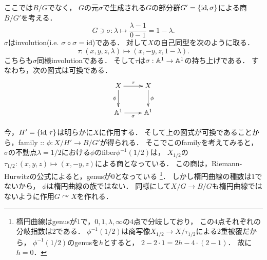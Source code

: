 \documentclass[a4paper]{jsarticle}
\newcommand{\acton}{\curvearrowright}
\begin{document}
\begin{Example}
        ここでは$B/G$でなく，
        $G$の元$\sigma$で生成される$G$の部分群$G'=\{\mathrm{id}_{\!}, \sigma\}$による商$B/G'$を考える．
        \[ G \ni \sigma: \lambda \mapsto \frac{\lambda-1}{0-1}=1-\lambda. \]
        $\sigma$はinvolution(i.e. $\sigma \circ \sigma=\mathrm{id}_{\!}$)である．
        対して$X$の自己同型を次のように取る．
        \[ \tau: (x,y,z, \lambda) \mapsto (x,-y,z,1-\lambda). \]
        こちらも$\sigma$同様involutionである．
        そして$\tau$は$\sigma: \mathbb{A}^1 \to \mathbb{A}^1$の持ち上げである．
        すなわち，次の図式は可換である．
        \[\xymatrix{
                X \ar[r]^-{\tau}\ar[d]_-{\phi}& X \ar[d]^-{\phi}\\
                \affine^1 \ar[r]_-{\sigma}& \affine^1
        }\]
        
        今，$H'=\{\mathrm{id}_{\!}, \tau\}$は明らかに$X$に作用する．
        そして上の図式が可換であることから，family :: $\phi: X/H' \to B/G'$が得られる．
        そこでこのfamilyを考えてみると，
        $\sigma$の不動点$\lambda=1/2$における$\phi$のfiber$\phi^{-1}(1/2)$は，
        $X_{1/2}$の$\tau_{1/2}:(x,y,z) \mapsto (x,-y,z)$による商となっている．
        この商は，Riemann-Hurwitzの公式によると，genusが$0$となっている
        \footnote
        {
            楕円曲線はgenusが$1$で，$0,1,\lambda, \infty$の$4$点で分岐しており，
            この$4$点それぞれの分岐指数は$2$である．
            $\phi^{-1}(1/2)$は商写像$X_{1/2} \to X/\tau_{1/2}$による2重被覆だから，
            $\phi^{-1}(1/2)$のgenusを$h$とすると，
            $2-2 \cdot 1=2h-4 \cdot (2-1)$．
            故に$h=0$．
        }．
        しかし楕円曲線の種数は$1$でないから，
        $\phi$は楕円曲線の族ではない．
        同様にして$X/G \to B/G$も楕円曲線ではないように作用$G \acton X$を作れる．
    \end{Example}
\end{document}
